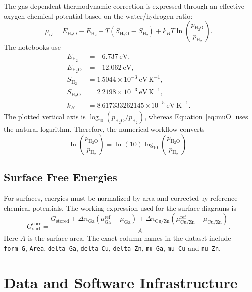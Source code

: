 \documentclass[12pt,a4paper,oneside]{report}
\begin{document}
The gas-dependent thermodynamic correction is expressed through an effective
oxygen chemical potential based on the water/hydrogen ratio:
\begin{equation}
  \mu_O =
  E_{\mathrm{H_2O}} - E_{\mathrm{H_2}}
  - T(S_{\mathrm{H_2O}} - S_{\mathrm{H_2}})
  + k_B T \ln\left(\frac{p_{\mathrm{H_2O}}}{p_{\mathrm{H_2}}}\right).
  \label{eq:muO}
\end{equation}
The notebooks use
\begin{align}
  E_{\mathrm{H_2}} &= -6.737~\mathrm{eV},\\
  E_{\mathrm{H_2O}} &= -12.062~\mathrm{eV},\\
  S_{\mathrm{H_2}} &= 1.5044\times 10^{-3}~\mathrm{eV~K^{-1}},\\
  S_{\mathrm{H_2O}} &= 2.2198\times 10^{-3}~\mathrm{eV~K^{-1}},\\
  k_B &= 8.617333262145\times 10^{-5}~\mathrm{eV~K^{-1}}.
\end{align}
The plotted vertical axis is
$\log_{10}(p_{\mathrm{H_2O}}/p_{\mathrm{H_2}})$, whereas
Equation~\ref{eq:muO} uses the natural logarithm. Therefore, the numerical workflow
converts
\begin{equation}
  \ln\left(\frac{p_{\mathrm{H_2O}}}{p_{\mathrm{H_2}}}\right)
  =
  \ln(10)\log_{10}\left(\frac{p_{\mathrm{H_2O}}}{p_{\mathrm{H_2}}}\right).
\end{equation}

\section{Surface Free Energies}

For surfaces, energies must be normalized by area and corrected by reference
chemical potentials. The working expression used for the surface diagrams is
\begin{equation}
  G_\mathrm{surf}^{\mathrm{corr}}
  =
  \frac{
    G_\mathrm{stored}
    + \Delta n_{\mathrm{Ga}}(\mu_{\mathrm{Ga}}^\mathrm{ref}-\mu_{\mathrm{Ga}})
    + \Delta n_{\mathrm{Cu/Zn}}(\mu_{\mathrm{Cu/Zn}}^\mathrm{ref}-\mu_{\mathrm{Cu/Zn}})
  }{A}.
  \label{eq:surfaceG}
\end{equation}
Here $A$ is the surface area. The exact column names in the dataset include
\texttt{form\_G}, \texttt{Area}, \texttt{delta\_Ga}, \texttt{delta\_Cu},
\texttt{delta\_Zn}, \texttt{mu\_Ga}, \texttt{mu\_Cu} and \texttt{mu\_Zn}.

\chapter{Data and Software Infrastructure}
\end{document}
